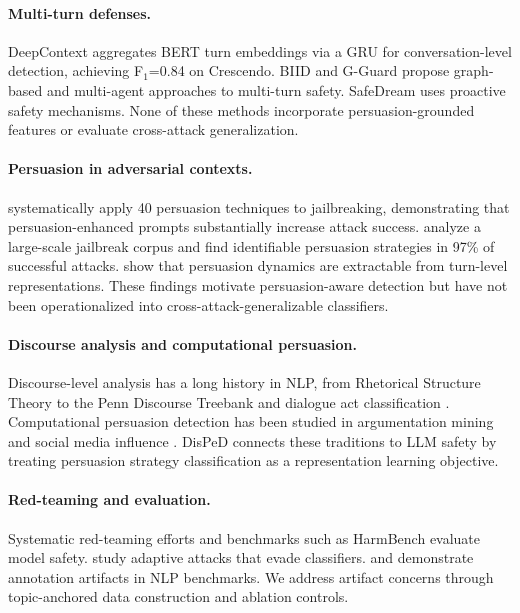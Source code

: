 \documentclass[11pt,a4paper]{article}
\newcommand{\ours}{DisPeD}
\newcommand{\fone}{F$_1$}
\begin{document}
\paragraph{Multi-turn defenses.}
DeepContext \citep{su2026} aggregates BERT turn embeddings via a GRU for conversation-level detection, achieving \fone{}=0.84 on Crescendo.
BIID \citep{biid2025} and G-Guard \citep{gguard2025} propose graph-based and multi-agent approaches to multi-turn safety.
SafeDream \citep{safedream2025} uses proactive safety mechanisms.
None of these methods incorporate persuasion-grounded features or evaluate cross-attack generalization.

\paragraph{Persuasion in adversarial contexts.}
\citet{zeng2024pap} systematically apply 40 persuasion techniques to jailbreaking, demonstrating that persuasion-enhanced prompts substantially increase attack success.
\citet{hagendorff2026} analyze a large-scale jailbreak corpus and find identifiable persuasion strategies in 97\% of successful attacks.
\citet{howdollms2025} show that persuasion dynamics are extractable from turn-level representations.
These findings motivate persuasion-aware detection but have not been operationalized into cross-attack-generalizable classifiers.

\paragraph{Discourse analysis and computational persuasion.}
Discourse-level analysis has a long history in NLP, from Rhetorical Structure Theory \citep{mann1988} to the Penn Discourse Treebank \citep{prasad2008pdtb} and dialogue act classification \citep{stolcke2000}.
Computational persuasion detection has been studied in argumentation mining \citep{habernal2016} and social media influence \citep{tan2016}.
\ours{} connects these traditions to LLM safety by treating persuasion strategy classification as a representation learning objective.

\paragraph{Red-teaming and evaluation.}
Systematic red-teaming efforts \citep{perez2022,ganguli2022} and benchmarks such as HarmBench \citep{mazeika2024} evaluate model safety.
\citet{nasr2025} study adaptive attacks that evade classifiers.
\citet{gururangan2018} and \citet{niven2019} demonstrate annotation artifacts in NLP benchmarks.
We address artifact concerns through topic-anchored data construction and ablation controls.
\end{document}
